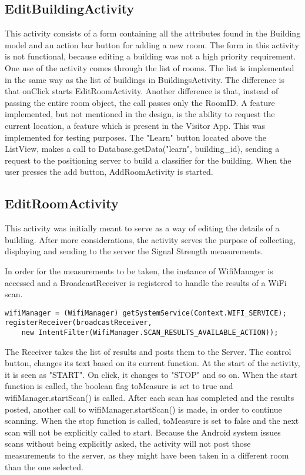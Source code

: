 \subsection{EditBuildingActivity}
This activity consists of a form containing all the attributes found in the Building model and an action bar button for adding a new room. The form in this activity is not functional, because editing a building was not a high priority requirement. 
One use of the activity comes through the list of rooms. The list is implemented in the same way as the list of buildings in BuildingsActivity. The difference is that onClick starts EditRoomActivity. Another difference is that, instead of passing the entire room object, the call passes only the RoomID. A feature implemented, but not mentioned in the design, is the ability to request the current location, a feature which is present in the Visitor App. This was implemented for testing purposes.
The "Learn" button located above the ListView, makes a call to Database.getData("learn", building\_id), sending a request to the positioning server to build a classifier for the building.
When the user presses the add button, AddRoomActivity is started.

\subsection{EditRoomActivity}
This activity was initially meant to serve as a way of editing the details of a building. After more considerations, the activity serves the purpose of collecting, displaying and sending to the server the Signal Strength measurements. 

\noindent
In order for the measurements to be taken, the instance of WifiManager is accessed and a BroadcastReceiver is registered to handle the results of a WiFi scan.
\begin{lstlisting}
wifiManager = (WifiManager) getSystemService(Context.WIFI_SERVICE);
registerReceiver(broadcastReceiver, 
	new IntentFilter(WifiManager.SCAN_RESULTS_AVAILABLE_ACTION));
\end{lstlisting}
The Receiver takes the list of results and posts them to the Server. The control button, changes its text based on its current function. At the start of the activity, it is seen as "START". On click, it changes to "STOP" and so on. When the start function is called,  the boolean flag toMeasure is set to true and wifiManager.startScan() is called. After each scan has completed and the results posted, another call to wifiManager.startScan() is made, in order to continue scanning. When the stop function is called, toMeasure is set to false and the next scan will not be explicitly called to start. Because the Android system issues scans without being explicitly asked, the activity will not post those measurements to the server, as they might have been taken in a different room than the one selected. 
